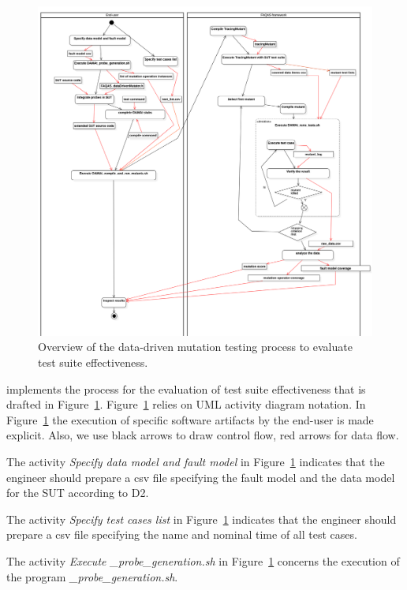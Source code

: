 \begin{figure}[h]
  \centering
	\includegraphics[width=\textwidth]{images/png/data_driven_process.png}
      \caption{Overview of the data-driven mutation testing process to evaluate test suite effectiveness.}
      \label{fig:process:dataDriven:evaluation}
\end{figure}
%
\dama implements the process for the evaluation of test suite effectiveness that is drafted in Figure~\ref{fig:process:dataDriven:evaluation}. Figure~\ref{fig:process:dataDriven:evaluation} relies on UML activity diagram notation. In Figure~\ref{fig:process:dataDriven:evaluation} the execution of specific software artifacts by the end-user is made explicit. Also, we use black arrows to draw control flow, red arrows for data flow.

The activity \emph{Specify data model and fault model} in Figure~\ref{fig:process:dataDriven:evaluation} indicates that the engineer should prepare a csv file specifying the fault model and the data model for the SUT according to D2.

The activity \emph{Specify test cases list} in Figure~\ref{fig:process:dataDriven:evaluation} indicates that the engineer should prepare a csv file specifying the name and nominal time of all test cases.

The activity \emph{Execute \dama\_probe\_generation.sh} in Figure~\ref{fig:process:dataDriven:evaluation} concerns the execution of the program \emph{\dama\_probe\_generation.sh}.


